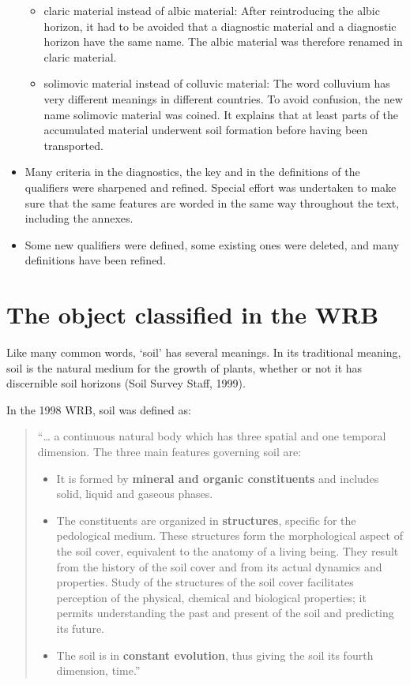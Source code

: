 \documentclass[
  letterpaper,
  DIV=11,
  numbers=noendperiod]{scrreprt}
\providecommand{\tightlist}{%
  \setlength{\itemsep}{0pt}\setlength{\parskip}{0pt}}\usepackage{longtable,booktabs,array}
\begin{document}
\begin{itemize}
  \begin{itemize}
  \tightlist
  \item
    claric material instead of albic material: After reintroducing the
    albic horizon, it had to be avoided that a diagnostic material and a
    diagnostic horizon have the same name. The albic material was
    therefore renamed in claric material.
  \item
    solimovic material instead of colluvic material: The word colluvium
    has very different meanings in different countries. To avoid
    confusion, the new name solimovic material was coined. It explains
    that at least parts of the accumulated material underwent soil
    formation before having been transported.
  \end{itemize}
\item
  Many criteria in the diagnostics, the key and in the definitions of
  the qualifiers were sharpened and refined. Special effort was
  undertaken to make sure that the same features are worded in the same
  way throughout the text, including the annexes.
\item
  Some new qualifiers were defined, some existing ones were deleted, and
  many definitions have been refined.
\end{itemize}

\hypertarget{the-object-classified-in-the-wrb}{%
\section{The object classified in the
WRB}\label{the-object-classified-in-the-wrb}}

Like many common words, `soil' has several meanings. In its traditional
meaning, soil is the natural medium for the growth of plants, whether or
not it has discernible soil horizons (Soil Survey Staff, 1999).

In the 1998 WRB, soil was defined as:

\begin{quote}
``\ldots{} a continuous natural body which has three spatial and one
temporal dimension. The three main features governing soil are:

\begin{itemize}
\tightlist
\item
  It is formed by \textbf{mineral and organic constituents} and includes
  solid, liquid and gaseous phases.
\item
  The constituents are organized in \textbf{structures}, specific for
  the pedological medium. These structures form the morphological aspect
  of the soil cover, equivalent to the anatomy of a living being. They
  result from the history of the soil cover and from its actual dynamics
  and properties. Study of the structures of the soil cover facilitates
  perception of the physical, chemical and biological properties; it
  permits understanding the past and present of the soil and predicting
  its future.
\item
  The soil is in \textbf{constant evolution}, thus giving the soil its
  fourth dimension, time.''
\end{itemize}
\end{quote}
\end{document}
